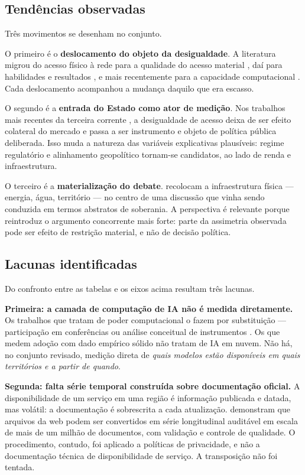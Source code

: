 \documentclass[12pt,a4paper]{article}
\begin{document}
\subsection{Tendências observadas}

Três movimentos se desenham no conjunto.

O primeiro é o \textbf{deslocamento do objeto da desigualdade}. A literatura migrou do
acesso físico à rede para a qualidade do acesso material \cite{vandeursen2018}, daí
para habilidades e resultados \cite{lutz2019}, e mais recentemente para a capacidade
computacional \cite{ahmed2020,sastry2024}. Cada deslocamento acompanhou a mudança
daquilo que era escasso.

O segundo é a \textbf{entrada do Estado como ator de medição}. Nos trabalhos mais
recentes da terceira corrente \cite{sastry2024,mugge2024}, a desigualdade de acesso
deixa de ser efeito colateral do mercado e passa a ser instrumento e objeto de
política pública deliberada. Isso muda a natureza das variáveis explicativas
plausíveis: regime regulatório e alinhamento geopolítico tornam-se candidatos, ao lado
de renda e infraestrutura.

O terceiro é a \textbf{materialização do debate}. \textcite{furtado2024} recolocam a
infraestrutura física --- energia, água, território --- no centro de uma discussão que
vinha sendo conduzida em termos abstratos de soberania. A perspectiva é relevante
porque reintroduz o argumento concorrente mais forte: parte da assimetria observada
pode ser efeito de restrição material, e não de decisão política.

\subsection{Lacunas identificadas}

Do confronto entre as tabelas e os eixos acima resultam três lacunas.

\textbf{Primeira: a camada de computação de IA não é medida diretamente.} Os trabalhos
que tratam de poder computacional o fazem por substituição --- participação em
conferências \cite{ahmed2020} ou análise conceitual de instrumentos
\cite{sastry2024}. Os que medem adoção com dado empírico sólido
\cite{mcelheran2024,knez2023} não tratam de IA em nuvem. Não há, no conjunto revisado,
medição direta de \emph{quais modelos estão disponíveis em quais territórios e a
partir de quando}.

\textbf{Segunda: falta série temporal construída sobre documentação oficial.} A
disponibilidade de um serviço em uma região é informação publicada e datada, mas
volátil: a documentação é sobrescrita a cada atualização. \textcite{amos2021}
demonstram que arquivos da web podem ser convertidos em série longitudinal auditável
em escala de mais de um milhão de documentos, com validação e controle de qualidade.
O procedimento, contudo, foi aplicado a políticas de privacidade, e não a documentação
técnica de disponibilidade de serviço. A transposição não foi tentada.
\end{document}
